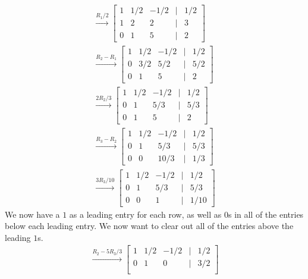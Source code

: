 \begin{example}
\begin{solution}
        \begin{gather*}\overset{R_1/2}{\longrightarrow} \begin{bmatrix}
            1 & 1/2 & -1/2 & \vert & 1/2 \\
            1 & 2 & 2 & \vert & 3 \\
            0 & 1 & 5 & \vert & 2
        \end{bmatrix} \\
        \overset{R_2-R_1}{\longrightarrow} \begin{bmatrix}
            1 & 1/2 & -1/2 & \vert & 1/2 \\
            0 & 3/2 & 5/2 & \vert & 5/2 \\
            0 & 1 & 5 & \vert & 2
        \end{bmatrix}\\
        \overset{2R_2/3}{\longrightarrow} \begin{bmatrix}
            1 & 1/2 & -1/2 & \vert & 1/2 \\
            0 & 1 & 5/3 & \vert & 5/3 \\
            0 & 1 & 5 & \vert & 2
        \end{bmatrix}\\
        \overset{R_3-R_2}{\longrightarrow} \begin{bmatrix}
            1 & 1/2 & -1/2 & \vert & 1/2 \\
            0 & 1 & 5/3 & \vert & 5/3 \\
            0 & 0 & 10/3 & \vert & 1/3
        \end{bmatrix}\\
        \overset{3R_3/10}{\longrightarrow} \begin{bmatrix}
            1 & 1/2 & -1/2 & \vert & 1/2 \\
            0 & 1 & 5/3 & \vert & 5/3 \\
            0 & 0 & 1 & \vert & 1/10
        \end{bmatrix}
        \end{gather*}
        We now have a \(1\) as a leading entry for each row, as well as \(0\)s in all of the entries below each leading entry. We now want to clear out all of the entries above the leading \(1\)s.
        \begin{gather*}
        \overset{R_2 - 5R_3/3}{\longrightarrow} \begin{bmatrix}
            1 & 1/2 & -1/2 & \vert & 1/2 \\
            0 & 1 & 0 & \vert & 3/2 \\

\end{bmatrix}
\end{gather*}
\end{solution}
\end{example}
